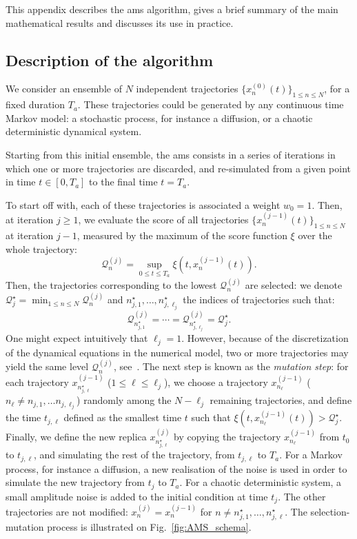 \newtheorem{theo}{Theorem}

This appendix describes the \ac{ams} algorithm, gives a brief summary of the main
mathematical results and discusses its use in practice.
\subsection{Description of the algorithm}
We consider an ensemble of $N$ independent trajectories $\{x_n^{(0)}(t)\}_{1\leq n \leq N}$, for a fixed duration $T_a$.
These trajectories could be generated by any continuous time Markov model: a stochastic process, for instance a diffusion, or a chaotic deterministic dynamical system.

Starting from this initial ensemble, the \ac{ams} consists in a series of iterations in which one or more trajectories are discarded, and re-simulated from a given point in time $t \in [0, T_a]$ to the final time $t = T_a$.

To start off with, each of these trajectories is associated a weight $w_0=1$.
Then, at iteration $j\geq 1$, we evaluate the score of all trajectories $\{x_n^{(j-1)}(t)\}_{1 \leq n \leq N}$ at iteration $j-1$, measured by the maximum of the score function $\xi$ over the whole trajectory:
\begin{equation}
  \mathcal{Q}_n^{(j)} = \sup_{0 \leq t \leq T_a} \xi(t,x_n^{(j-1)}(t)).
\end{equation}
Then, the trajectories corresponding to the lowest $\mathcal{Q}_n^{(j)}$ are selected: we denote $\mathcal{Q}_j^\star= \min_{1\leq n \leq N} \mathcal{Q}_n^{(j)}$ and $n_{j,1}^\star,\ldots,n_{j,\ell_j}^\star$ the indices of trajectories such that:
\begin{equation}
  \label{eq:ams_threshold_def}
  \mathcal{Q}_{n_{j,1}^\star}^{(j)} = \cdots = \mathcal{Q}_{n_{j,\ell_j}^\star}^{(j)} = \mathcal{Q}_j^\star.
\end{equation}
One might expect intuitively that $\ell_j=1$.
However, because of the discretization of the dynamical equations in the numerical model, two or more trajectories may yield the same level $\mathcal{Q}_n^{(j)}$, see~\cite{Brehier2016a}.
The next step is known as the \textit{mutation step}: for each trajectory $x_{n_{j,\ell}^\star}^{(j-1)}$ ($1 \leq \ell \leq \ell_j$), we choose a trajectory $x_{n_\ell}^{(j-1)}$ ($n_{\ell} \neq n_{j,1},\ldots n_{j,\ell_j}$) randomly among the $N-\ell_j$ remaining trajectories, and define the time $t_{j,\ell}$ defined as the smallest time $t$ such that $\xi(t,x_{n_\ell}^{(j-1)}(t))>\mathcal{Q}_j^\star$.
Finally, we define the new replica $x_{n_{j,\ell}^\star}^{(j)}$ by copying the trajectory $x_{n_\ell}^{(j-1)}$ from $t_0$ to $t_{j,\ell}$, and simulating the rest of the trajectory, from $t_{j,\ell}$ to $T_a$.
For a Markov process, for instance a diffusion, a new realisation of the noise is used in order to simulate the new trajectory from $t_j$ to $T_a$.
For a chaotic deterministic system, a small amplitude noise is added to the initial condition at time $t_j$.
The other trajectories are not modified: $x_n^{(j)}=x_n^{(j-1)}$ for $n \neq n_{j,1}^\star,\ldots,n_{j,\ell}^\star$.
The selection-mutation process is illustrated on Fig.~\ref{fig:AMS_schema}.

